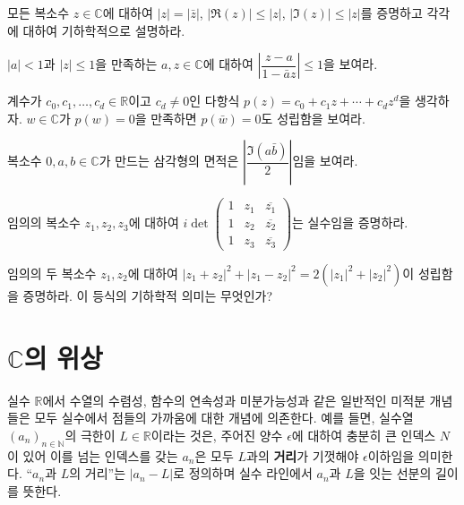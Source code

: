 \begin{salt_exercise} \label{ex-1-16}
모든 복소수 $z\in\mathbb C$에 대하여
$|z|=|\bar z|$, $|\Re(z)|\le |z|$, $|\Im(z)| \le |z|$를 증명하고
각각에 대하여 기하학적으로 설명하라.
\end{salt_exercise}

\begin{salt_exercise} \label{ex-1-17}
$|a|<1$과 $|z|\le 1$을 만족하는 $a,z\in\mathbb C$에 대하여
$\left| \dfrac{z-a}{1-\bar a z}\right| \le 1$을 보여라.
\end{salt_exercise}

\begin{salt_exercise} \label{ex-1-18}
계수가 $c_0, c_1, \ldots, c_d\in\mathbb R$이고 $c_d\ne0$인 다항식
$p(z) = c_0+c_1z+\cdots + c_dz^d$을 생각하자.
$w\in\mathbb C$가 $p(w)=0$을 만족하면 $p(\bar w)=0$도 성립함을 보여라.
\end{salt_exercise}

\begin{salt_exercise} \label{ex-1-19}
복소수 $0, a, b \in\mathbb C$가 만드는 삼각형의 면적은
$\left| \dfrac{\Im(a\bar b)}2\right|$임을 보여라.
\end{salt_exercise}

\begin{salt_exercise} \label{ex-1-20}
임의의 복소수 $z_1,z_2, z_3$에 대하여
$i\det \begin{pmatrix}
1 & z_1 & \overline{z_1} \\
1 & z_2 & \overline{z_2} \\
1 & z_3 & \overline{z_3} 
\end{pmatrix}$는 실수임을 증명하라.
\end{salt_exercise}

\begin{salt_exercise} \label{ex-1-21}
임의의 두 복소수 $z_1, z_2$에 대하여
$|z_1+z_2|^2 + |z_1-z_2|^2 =2(|z_1|^2+|z_2|^2)$이 성립함을 증명하라.
이 등식의 기하학적 의미는 무엇인가?
\end{salt_exercise}

\section{$\mathbb C$의 위상}

실수 $\mathbb R$에서 수열의 수렴성, 함수의 연속성과 미분가능성과 같은
일반적인 미적분 개념들은 모두 실수에서 점들의 가까움에 대한 개념에 의존한다.
예를 들면, 실수열 $(a_n)_{n\in\mathbb N}$의 극한이 $L\in\mathbb R$이라는 것은,
주어진 양수 $\epsilon$에 대하여 충분히 큰 인덱스 $N$이 있어 이를 넘는 인덱스를 갖는
 $a_n$은 모두 $L$과의 {\bf 거리}가 기껏해야 $\epsilon$이하임을 의미한다.
``$a_n$과  $L$의 거리''는 $|a_n-L|$로 정의하며
실수 라인에서 $a_n$과 $L$을 잇는 선분의 길이를 뜻한다.

